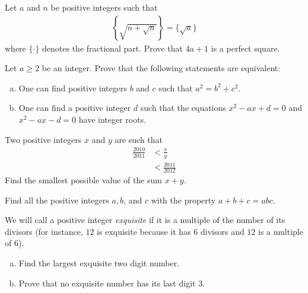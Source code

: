 \documentclass[problems.tex]{subfile}
\begin{document}
	\begin{problem}
		Let $a$ and $n$ be positive integers such that
		\begin{align*}
			\left\{ \sqrt{n + \sqrt{n}}\right\} = \big\{\sqrt a\big\}
		\end{align*}
		where $\{ \cdot \}$ denotes the fractional part. Prove that $4a+1$ is a perfect square.
	\end{problem}

	\begin{problem}
		Let $a \geq 2$ be an integer. Prove that the following statements are equivalent:
		\begin{enumerate}[(a)]
			\item One can find positive integers $b$ and $c$ such that $a^2 = b^2 + c^2$.
			\item One can find a positive integer $d$ such that the equations $x^2 - ax + d = 0$ and $x^2 - ax - d = 0$ have integer roots.
		\end{enumerate}
	\end{problem}

	\begin{problem}
		Two positive integers $x$ and $y$ are such that
		\begin{align*}
			\frac{2010}{2011}
				& < \frac{x}{y}\\
				& < \frac{2011}{2012}
		\end{align*}
		Find the smallest possible value of the sum $x + y$.
	\end{problem}

	\begin{problem}
		Find all the positive integers $a, b$, and $c$ with the property $a + b + c = abc$.
	\end{problem}

	\begin{problem}
		We will call a positive integer \textit{exquisite} if it is a multiple of the number of its divisors (for instance, $12$ is exquisite because it has $6$ divisors and $12$ is a multiple	of $6$).
		\begin{enumerate}[(a)]
			\item Find the largest exquisite two digit number.
			\item Prove that no exquisite number has its last digit $3$.
		\end{enumerate}
	\end{problem}
\end{document}
